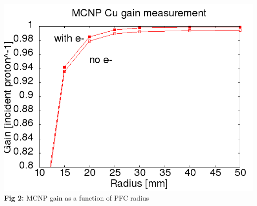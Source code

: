\documentclass[landscape,archE1,fontscale=0.285]{baposter} %
\begin{document}
\begin{poster}
{\begin{center}
\includegraphics[width=0.75\linewidth]{figures/MCNP_gain_radius.png}
\\{\fontsize{14.5}{16}\selectfont \textbf{Fig 2:} MCNP gain as a function of PFC radius}
\end{center}
}


\end{poster}
\end{document}
